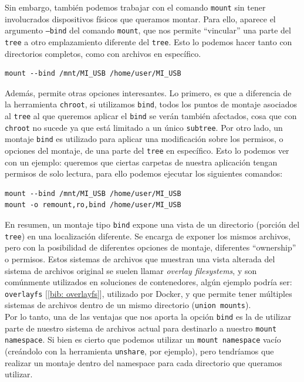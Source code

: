 \documentclass[12pt]{article}
\begin{document}
	\noindent Sin embargo, también podemos trabajar con el comando \texttt{mount} sin tener involucrados dispositivos físicos que queramos montar. Para ello, aparece el argumento \texttt{--bind} del comando \texttt{mount}, que nos permite ``vincular'' una parte del \texttt{tree} a otro emplazamiento diferente del \texttt{tree}. Esto lo podemos hacer tanto con directorios completos, como con archivos en específico.
	
	\begin{verbatim}
mount --bind /mnt/MI_USB /home/user/MI_USB
	\end{verbatim}

	\noindent Además, permite otras opciones interesantes. Lo primero, es que a diferencia de la herramienta \texttt{chroot}, si utilizamos \texttt{bind}, todos los puntos de montaje asociados al \texttt{tree} al que queremos aplicar el \texttt{bind} se verán también afectados, cosa que con \texttt{chroot} no sucede ya que está limitado a un único \texttt{subtree}. Por otro lado, un montaje \texttt{bind} es utilizado para aplicar una modificación sobre los permisos, o opciones del montaje, de una parte del \texttt{tree} en específico. Esto lo podemos ver con un ejemplo: queremos que ciertas carpetas de nuestra aplicación tengan permisos de solo lectura, para ello podemos ejecutar los siguientes comandos:
	
	\begin{verbatim}
mount --bind /mnt/MI_USB /home/user/MI_USB
mount -o remount,ro,bind /home/user/MI_USB
	\end{verbatim}

	\noindent En resumen, un montaje tipo \texttt{bind} expone una vista de un directorio (porción del \texttt{tree}) en una localización diferente. Se encarga de exponer los mismos archivos, pero con la posibilidad de diferentes opciones de montaje, diferentes ``ownership'' o permisos. Estos sistemas de archivos que muestran una vista alterada del sistema de archivos original se suelen llamar \textit{overlay filesystems}, y son comúnmente utilizados en soluciones de contenedores, algún ejemplo podría ser: \texttt{overlayfs} [\ref{bib: overlayfs}], utilizado por Docker, y que permite tener múltiples sistemas de archivos dentro de un mismo directorio (\texttt{union mounts}). \\

	\noindent Por lo tanto, una de las ventajas que nos aporta la opción \texttt{bind} es la de utilizar parte de nuestro sistema de archivos actual para destinarlo a nuestro \texttt{mount namespace}. Si bien es cierto que podemos utilizar un \texttt{mount namespace} vacío (creándolo con la herramienta \texttt{unshare}, por ejemplo), pero tendríamos que realizar un montaje dentro del namespace para cada directorio que queramos utilizar.
	
\end{document}

